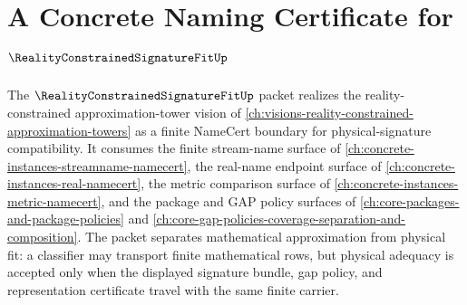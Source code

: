 \chapter{A Concrete Naming Certificate for $\RealityConstrainedSignatureFitUp$}
\label{ch:concrete-instances-reality-constrained-signature-fit-namecert}

The $\RealityConstrainedSignatureFitUp$ packet realizes the reality-constrained approximation-tower vision of \autoref{ch:visions-reality-constrained-approximation-towers} as a finite NameCert boundary for physical-signature compatibility. It consumes the finite stream-name surface of \autoref{ch:concrete-instances-streamname-namecert}, the real-name endpoint surface of \autoref{ch:concrete-instances-real-namecert}, the metric comparison surface of \autoref{ch:concrete-instances-metric-namecert}, and the package and GAP policy surfaces of \autoref{ch:core-packages-and-package-policies} and \autoref{ch:core-gap-policies-coverage-separation-and-composition}. The packet separates mathematical approximation from physical fit: a classifier may transport finite mathematical rows, but physical adequacy is accepted only when the displayed signature bundle, gap policy, and representation certificate travel with the same finite carrier.

